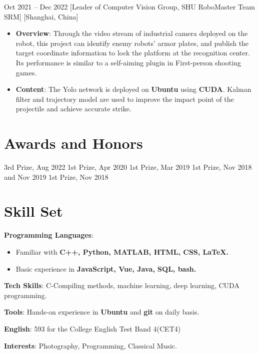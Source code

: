 \documentclass{chicv}
\begin{document}
  {Oct 2021 -- Dec 2022}
  [Leader of Computer Vision Group, SHU RoboMaster Team SRM]
  [Shanghai, China]
  \begin{itemize}
    \item \textbf{Overview}: Through the video stream of industrial camera deployed on the robot, this project can identify enemy robots' armor plates, and publish the target coordinate information to lock the platform at the recognition center. Its performance is similar to a self-aiming plugin in First-person shooting games.
    \item \textbf{Content}: The Yolo network is deployed on \textbf{Ubuntu} using \textbf{CUDA}. Kalman filter and trajectory model are used to improve the impact point of the projectile and achieve accurate strike.
  \end{itemize}

\section{Awards and Honors}
 {3rd Prize, Aug 2022}
 {1st Prize, Apr 2020}
 {1st Prize, Mar 2019}
 {1st Prize, Nov 2018 and Nov 2019}
 {1st Prize, Nov 2018}

\section{Skill Set}
\begin{compactlist}
  \item \textbf{Programming Languages}: 
  \begin{itemize}
    \item Familiar with \textbf{C++, Python, MATLAB, HTML, CSS, \LaTeX.}
    \item Basic experience in \textbf{JavaScript, Vue, Java, SQL, bash.}
  \end{itemize}
  \item \textbf{Tech Skills}: C-Compiling methods, machine learning, deep learning, CUDA programming.
  \item \textbf{Tools}: Hands-on experience in \textbf{Ubuntu} and \textbf{git} on daily basis.
  \item \textbf{English}: 593 for the College English Test Band 4(CET4)
  \item \textbf{Interests}: Photography, Programming, Classical Music.
\end{compactlist}
\end{document}
